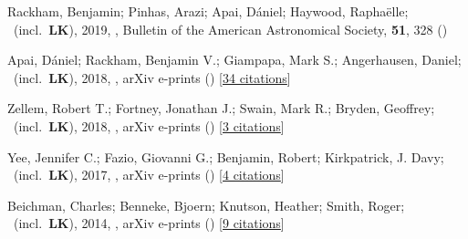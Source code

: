 \item[{\color{numcolor}\scriptsize5}] Rackham, Benjamin; Pinhas, Arazi; Apai, D{\'a}niel; Haywood, Rapha{\"e}lle; \etal\ (incl.\ \textbf{LK}), 2019, , Bulletin of the American Astronomical Society, \textbf{51}, 328 ()

\item[{\color{numcolor}\scriptsize4}] Apai, D{\'a}niel; Rackham, Benjamin V.; Giampapa, Mark S.; Angerhausen, Daniel; \etal\ (incl.\ \textbf{LK}), 2018, , arXiv e-prints () [\href{https://ui.adsabs.harvard.edu/abs/2018arXiv180308708A}{34 citations}]

\item[{\color{numcolor}\scriptsize3}] Zellem, Robert T.; Fortney, Jonathan J.; Swain, Mark R.; Bryden, Geoffrey; \etal\ (incl.\ \textbf{LK}), 2018, , arXiv e-prints () [\href{https://ui.adsabs.harvard.edu/abs/2018arXiv180307163Z}{3 citations}]

\item[{\color{numcolor}\scriptsize2}] Yee, Jennifer C.; Fazio, Giovanni G.; Benjamin, Robert; Kirkpatrick, J. Davy; \etal\ (incl.\ \textbf{LK}), 2017, , arXiv e-prints () [\href{https://ui.adsabs.harvard.edu/abs/2017arXiv171004194Y}{4 citations}]

\item[{\color{numcolor}\scriptsize1}] Beichman, Charles; Benneke, Bjoern; Knutson, Heather; Smith, Roger; \etal\ (incl.\ \textbf{LK}), 2014, , arXiv e-prints () [\href{https://ui.adsabs.harvard.edu/abs/2014arXiv1411.1754B}{9 citations}]
